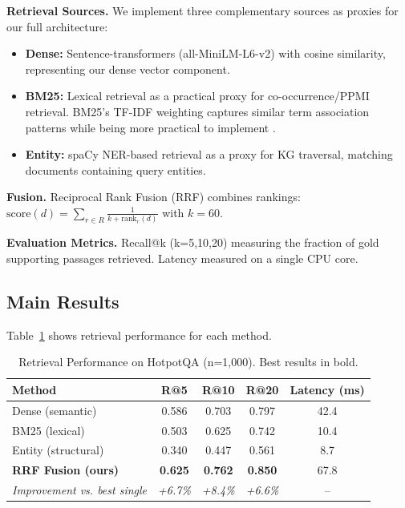 \documentclass[11pt,a4paper]{article}
\begin{document}
\textbf{Retrieval Sources.} We implement three complementary sources as proxies for our full architecture:
\begin{itemize}
    \item \textbf{Dense:} Sentence-transformers (all-MiniLM-L6-v2) with cosine similarity, representing our dense vector component.
    \item \textbf{BM25:} Lexical retrieval as a practical proxy for co-occurrence/PPMI retrieval. BM25's TF-IDF weighting captures similar term association patterns while being more practical to implement \citep{manning2008introduction}.
    \item \textbf{Entity:} spaCy NER-based retrieval as a proxy for KG traversal, matching documents containing query entities.
\end{itemize}

\textbf{Fusion.} Reciprocal Rank Fusion (RRF) \citep{cormack2009rrf} combines rankings: $\text{score}(d) = \sum_{r \in R} \frac{1}{k + \text{rank}_r(d)}$ with $k=60$.

\textbf{Evaluation Metrics.} Recall@k (k=5,10,20) measuring the fraction of gold supporting passages retrieved. Latency measured on a single CPU core.

\subsection{Main Results}

Table~\ref{tab:main_results} shows retrieval performance for each method.

\begin{table}[h]
\centering
\caption{Retrieval Performance on HotpotQA (n=1,000). Best results in bold.}
\label{tab:main_results}
\begin{tabular}{lcccc}
\toprule
\textbf{Method} & \textbf{R@5} & \textbf{R@10} & \textbf{R@20} & \textbf{Latency (ms)} \\
\midrule
Dense (semantic) & 0.586 & 0.703 & 0.797 & 42.4 \\
BM25 (lexical) & 0.503 & 0.625 & 0.742 & 10.4 \\
Entity (structural) & 0.340 & 0.447 & 0.561 & 8.7 \\
\midrule
\textbf{RRF Fusion (ours)} & \textbf{0.625} & \textbf{0.762} & \textbf{0.850} & 67.8 \\
\midrule
\textit{Improvement vs. best single} & \textit{+6.7\%} & \textit{+8.4\%} & \textit{+6.6\%} & -- \\
\bottomrule
\end{tabular}
\end{table}
\end{document}
